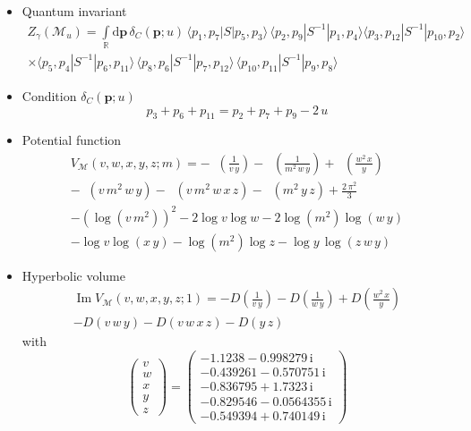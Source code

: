\documentclass[12pt,reqno]{amsart}
\numberwithin{equation}{section}
\renewcommand{\Im}{\operatorname{Im}}
\DeclareMathOperator{\Li}{Li_2}
\newcommand{\I}{\mathrm{i}}
\begin{document}
\begin{itemize}
\item  Quantum invariant
\begin{multline*}
  Z_\gamma \left( \mathcal{M}_u \right)
  = \int\limits_\mathbb{R} 
 \mathrm{d} \boldsymbol{p} \,
  \delta_C(\boldsymbol{p}; u ) \,
  \langle p_1 , p_7 | S | p_5 , p_3 \rangle \,
  \langle p_2 , p_9 | S^{-1} | p_1 , p_4 \rangle 
  \langle p_3 , p_{12} | S^{-1} | p_{10} , p_2 \rangle 
  \\
  \times 
  \langle p_5 , p_4 | S^{-1} | p_6 , p_{11} \rangle \,
  \langle p_8 , p_6 | S^{-1} | p_7 , p_{12} \rangle \,
  \langle p_{10} , p_{11} | S^{-1} | p_9 , p_8 \rangle 
\end{multline*}


\item
Condition $\delta_C(\boldsymbol{p};u)$
\begin{equation*}
  p_3 + p_6 + p_{11} = p_2 + p_7 + p_9 -  2\, u
\end{equation*}

\item Potential function
\begin{multline*}
  V_{\mathcal{M}}(v,w,x,y,z; m)
  =
  - \Li\left(\frac{1}{v \, y} \right)
  - \Li\left(\frac{1}{m^2 \, w \, y} \right)
  + \Li\left(\frac{w^2 \, x}{y} \right)
  \\
  - \Li\left(v \, m^2 \, w \, y\right) 
  - \Li\left( v \, m^2 \, w \, x \, z \right)
  - \Li\left(m^2 \, y \, z\right)
  +  \frac{2 \, \pi^2}{3}
  \\
  - 
  \left( \log(v \, m^2 ) \right)^2
  - 2 \log v \log w
  - 2 \log \left( m^2 \right) \log(w \, y)
  \\
  - \log v \log ( x \, y)
  - \log \left( m^2 \right) \log z
  - \log y \, \log(z \, w \, y)
\end{multline*}

\item Hyperbolic volume
\begin{multline*}
  \Im V_{\mathcal{M}}(v,w,x,y,z; 1)
  =
  - D\left(\frac{1}{v \, y} \right)
  - D\left(\frac{1}{ w \, y} \right)
  + D\left(\frac{w^2 \, x}{y} \right)
  \\
  - D\left(v  \, w \, y\right) 
  - D\left( v  \, w \, x \, z \right)
  - D\left( y \, z\right)
\end{multline*}
with
\begin{equation*}
  \begin{pmatrix}
    v \\ w\\ x\\ y \\ z
  \end{pmatrix}
  =
  \begin{pmatrix}
     -1.1238 - 0.998279 \, \I
     \\
     -0.439261 - 0.570751 \, \I
     \\
     -0.836795 + 1.7323  \, \I
     \\
     -0.829546 - 0.0564355 \, \I
     \\
      -0.549394 + 0.740149 \, \I
  \end{pmatrix}
\end{equation*}


\end{itemize}
\end{document}
